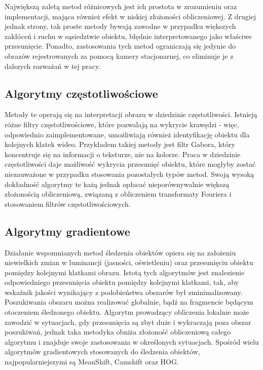 Największą zaletą metod różnicowych jest ich prostota w zrozumieniu oraz implementacji, mająca również efekt w niskiej złożoności obliczeniowej. Z drugiej jednak strony, tak proste metody bywają zawodne w przypadku większych zakłóceń i ruchu w sąsiedztwie obiektu, błędnie interpretowanego jako właściwe przesunięcie. Ponadto, zastosowania tych metod ograniczają się jedynie do obrazów rejestrowanych za pomocą kamery stacjonarnej, co eliminuje je z dalszych rozważań w tej pracy. 

\subsection{Algorytmy częstotliwościowe}
Metody te operają się na interpretacji obrazu w dziedzinie częstotliwości. Istnieją różne filtry częstotliwościowe, które pozwalają na wykrycie krawędzi - więc, odpowiednio zaimplementowane, umożliwiają również identyfikację obiektu dla kolejnych klatek wideo. Przykładem takiej metody jest filtr Gabora, który koncentruje się na informacji o teksturze, nie na kolorze. Praca w dziedzinie częstotliwości daje możliwość wykrycia przesunięć obiektu, które mogłyby zostać niezauważone w przypadku stosowania pozostałych typów metod. Swoją wysoką dokładność algorytmy te każą jednak opłacać nieporównywalnie większą złożonością obliczeniową, związaną z obliczeniem transformaty Fouriera i stosowaniem filtrów częstotliwościowych.

\subsection{Algorytmy gradientowe}
Działanie wspomnianych metod śledzenia obiektów opiera się na założeniu niewielkich zmian w luminancji (jasności, oświetleniu) oraz przesunięciu obiektu pomiędzy kolejnymi klatkami obrazu. Istotą tych algorytmów jest znalezienie odpowiedniego przesunięcia obiektu pomiędzy kolejnymi klatkami, tak, aby wskaźnik jakości wynikający z podobieństwa obszarów był zminimalizowany. Poszukiwania obszaru można realizować globalnie, bądź na fragmencie będącym otoczeniem śledzonego obiektu. Algorytm prowadzący obliczenia lokalnie może zawodzić w sytuacjach, gdy przesunięcia są zbyt duże i wykraczają poza obszar poszukiwań, jednak taka metodyka obniża złożoność obliczeniową całego algorytmu i znajduje swoje zastosowania w określonych sytuacjach. Spośród wielu algorytmów gradientowych stosowanych do śledzenia obiektów, najpopularniejszymi są MeanShift, Camshift oraz HOG.

